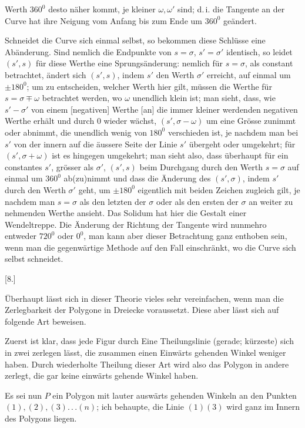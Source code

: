 %
Werth $360^0$ desto näher kommt, je kleiner $\omega, \omega'$ sind; d.\,i. die Tangente an der Curve hat ihre Neigung vom Anfang bis zum Ende um $360^0$ geändert.

Schneidet die Curve sich einmal selbst, so bekommen diese Schlüsse eine Abänderung. Sind nemlich die Endpunkte von $s = \sigma$, $s' = \sigma'$ identisch, so leidet $(s', s)$ für diese Werthe eine Sprungsänderung: nemlich für $s = \sigma$, als constant betrachtet, ändert sich $(s', s)$, indem $s'$ den Werth $\sigma'$ erreicht, auf einmal um $\pm 180^0$; um zu entscheiden, welcher Werth hier gilt, müssen die Werthe für $s = \sigma \mp \omega$ betrachtet werden, wo $\omega$ unendlich klein ist; man sieht, dass, wie $s' - \sigma'$ von einem [negativen] Werthe [an] die immer kleiner werdenden negativen Werthe erhält und durch $0$ wieder wächst, $(s', \sigma - \omega)$ um eine Grösse zunimmt oder abnimmt, die unendlich wenig von $180^0$ verschieden ist, je nachdem man bei $s'$ von der innern auf die äussere Seite der Linie $s'$ übergeht oder umgekehrt; für $(s', \sigma + \omega)$ ist es hingegen umgekehrt; man sieht also, dass überhaupt für ein constantes $s'$, grösser als $\sigma'$, $(s', s)$ beim Durchgang durch den Werth $s = \sigma$ auf einmal um $360^0$ ab(zu)nimmt und dass die Änderung des $(s', \sigma)$, indem $s'$ durch den Werth $\sigma'$ geht, um $\pm 180^0$ eigentlich mit beiden Zeichen zugleich gilt, je nachdem man $s = \sigma$ als den letzten der  $\sigma$ oder als den ersten der  $\sigma$ an weiter zu nehmenden Werthe ansieht. Das Solidum hat hier die Gestalt einer Wendeltreppe. Die Änderung der Richtung der Tangente wird nunmehro entweder $720^0$ oder $0^0$, man kann aber dieser Betrachtung ganz enthoben sein, wenn man die gegenwärtige Methode auf den Fall einschränkt, wo die Curve sich  selbst schneidet. 

\begin{center}
[8.]
\end{center}

Überhaupt lässt sich in dieser Theorie vieles sehr vereinfachen, wenn man die Zerlegbarkeit der Polygone in Dreiecke voraussetzt. Diese aber lässt sich auf folgende Art beweisen.

Zuerst ist klar, dass jede Figur durch Eine Theilungslinie (gerade; kürzeste) sich in zwei zerlegen lässt, die zusammen einen Einwärts gehenden Winkel weniger haben. Durch wiederholte Theilung dieser Art wird also das Polygon in andere zerlegt, die gar keine einwärts gehende Winkel haben.

Es sei nun $P$ ein Polygon mit lauter auswärts gehenden Winkeln an den Punkten $(1), (2), (3) .\,.\,. (n)$; ich behaupte, die Linie $(1)(3)$ wird ganz im Innern des Polygons liegen.
